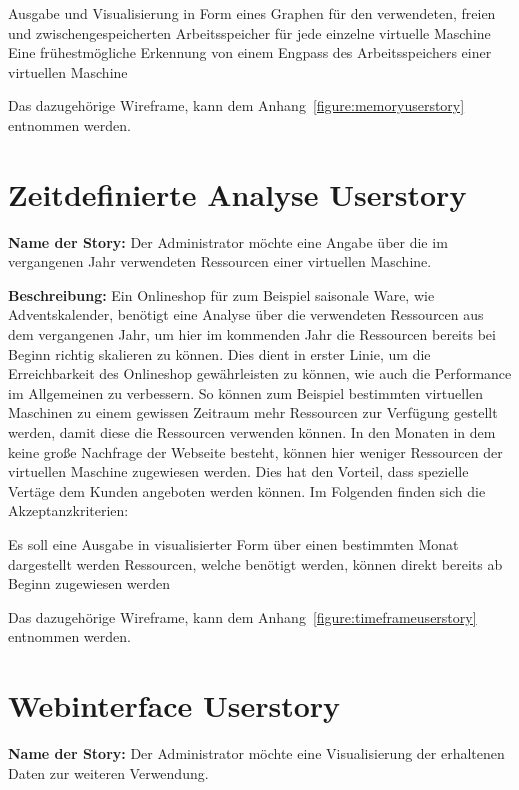 {\begin{outline}
  \1 Ausgabe und Visualisierung in Form eines Graphen für den verwendeten,
  freien und zwischengespeicherten Arbeitsspeicher für jede einzelne virtuelle
  Maschine
  \1 Eine frühestmögliche Erkennung von einem Engpass des Arbeitsspeichers
  einer virtuellen Maschine
\end{outline}

Das dazugehörige Wireframe, kann dem Anhang~\ref{figure:memoryuserstory}
entnommen werden.
\mr%

\section{Zeitdefinierte Analyse Userstory}
\textbf{Name der Story:} Der Administrator möchte eine Angabe über die im
vergangenen Jahr verwendeten Ressourcen einer virtuellen Maschine.

\textbf{Beschreibung:} Ein Onlineshop für zum Beispiel saisonale Ware, wie
Adventskalender, benötigt eine Analyse über die verwendeten Ressourcen aus dem
vergangenen Jahr, um hier im kommenden Jahr die Ressourcen bereits bei Beginn
richtig skalieren zu können. Dies dient in erster Linie, um die Erreichbarkeit
des Onlineshop gewährleisten zu können, wie auch die Performance im Allgemeinen
zu verbessern. So können zum Beispiel bestimmten virtuellen Maschinen zu einem
gewissen Zeitraum mehr Ressourcen zur Verfügung gestellt werden, damit diese
die Ressourcen verwenden können. In den Monaten in dem keine große Nachfrage
der Webseite besteht, können hier weniger Ressourcen der virtuellen Maschine
zugewiesen werden. Dies hat den Vorteil, dass spezielle Vertäge dem Kunden
angeboten werden können. Im Folgenden finden sich die Akzeptanzkriterien:

\begin{outline}
  \1 Es soll eine Ausgabe in visualisierter Form über einen bestimmten Monat
  dargestellt werden
  \1 Ressourcen, welche benötigt werden, können direkt bereits ab Beginn
  zugewiesen werden
\end{outline}

Das dazugehörige Wireframe, kann dem Anhang~\ref{figure:timeframeuserstory}
entnommen werden.
\mr%

\section{Webinterface Userstory}
\textbf{Name der Story:} Der Administrator möchte eine Visualisierung der
erhaltenen Daten zur weiteren Verwendung.

}
